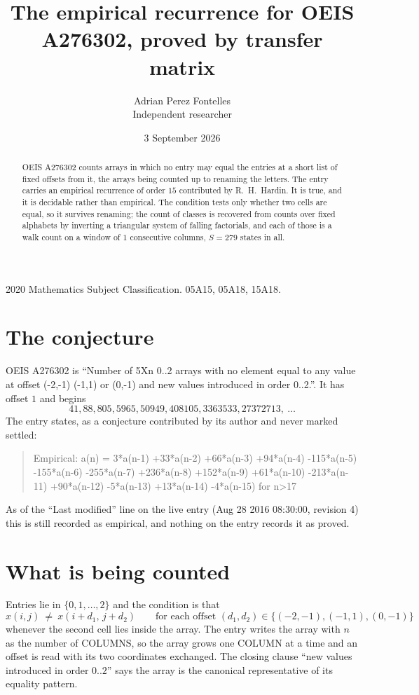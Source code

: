 \documentclass[11pt,a4paper]{article}
\title{The empirical recurrence for OEIS A276302, proved by transfer matrix}
\author{Adrian Perez Fontelles\\ \small Independent researcher}
\date{3 September 2026}
\theoremstyle{plain}
\theoremstyle{definition}
\begin{document}
\maketitle

\begin{abstract}
OEIS A276302 counts arrays in which no entry may equal the entries at a short list of fixed offsets
from it, the arrays being counted up to renaming the letters. The entry carries an empirical
recurrence of order $15$ contributed by R.~H.~Hardin. It is true, and it is decidable
rather than empirical. The condition tests only whether two cells are equal, so it survives
renaming; the count of classes is recovered from counts over fixed alphabets by inverting a
triangular system of falling factorials, and each of those is a walk count on a window of
$1$ consecutive columns, $S=279$ states in all.
\end{abstract}

\noindent\small 2020 Mathematics Subject Classification. 05A15, 05A18, 15A18.\normalsize

\section{The conjecture}

OEIS A276302 is ``Number of 5Xn 0..2 arrays with no element equal to any value at offset (-2,-1) (-1,1) or (0,-1) and new values introduced in order 0..2.''. It has offset $1$ and begins
\[
41, 88, 805, 5965, 50949, 408105, 3363533, 27372713,\ \dots
\]
The entry states, as a conjecture contributed by its author and never marked settled:
\begin{quote}
Empirical: a(n) = 3*a(n-1) +33*a(n-2) +66*a(n-3) +94*a(n-4) -115*a(n-5) -155*a(n-6) -255*a(n-7) +236*a(n-8) +152*a(n-9) +61*a(n-10) -213*a(n-11) +90*a(n-12) -5*a(n-13) +13*a(n-14) -4*a(n-15) for n>17
\end{quote}
As of the ``Last modified'' line on the live entry (Aug 28 2016 08:30:00, revision 4) this is still
recorded as empirical, and nothing on the entry records it as proved.

\section{What is being counted}

Entries lie in $\{0,1,\dots,2\}$ and the condition is that
\[
x(i,j)\ \ne\ x(i+d_1,\,j+d_2)\qquad\text{for each offset }(d_1,d_2)\in\{(-2,-1), (-1,1), (0,-1)\}
\]
whenever the second cell lies inside the array. The entry writes the array with $n$ as the number of COLUMNS, so the array grows one COLUMN at a time and an offset is read with its two coordinates exchanged. The closing clause ``new values
introduced in order $0..2$'' says the array is the canonical representative of its equality
pattern.
\end{document}
